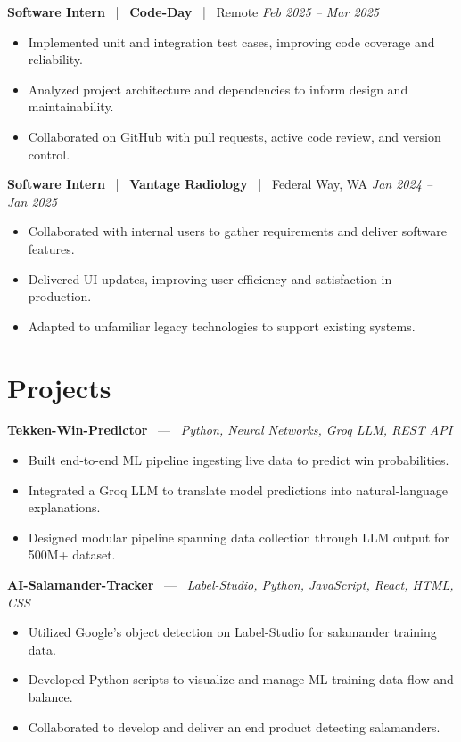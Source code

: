 \documentclass[10pt, letterpaper]{article}
\newcommand{\jobhead}[4]{%
  \vspace{5pt}%
  {\bfseries\color{dark}#1}%
  ~{\color{light}|}~%
  {\bfseries\color{navy}#2}%
  ~{\color{light}|}~%
  {\color{light}#3}%
  \hfill{\color{light}\small\textit{#4}}\\[-2pt]%
}
\newcommand{\projhead}[3]{%
  \vspace{5pt}%
  {\bfseries\color{dark}\href{#2}{#1}}%
  ~{\color{light}---}~%
  {\color{light}\small\textit{#3}}\\[-2pt]%
}
\begin{document}
\jobhead{Software Intern}{Code-Day}{Remote}{Feb 2025 – Mar 2025}
\begin{itemize}
  \item Implemented unit and integration test cases, improving code coverage and reliability.
  \item Analyzed project architecture and dependencies to inform design and maintainability.
  \item Collaborated on GitHub with pull requests, active code review, and version control.
\end{itemize}

\jobhead{Software Intern}{Vantage Radiology}{Federal Way, WA}{Jan 2024 – Jan 2025}
\begin{itemize}
  \item Collaborated with internal users to gather requirements and deliver software features.
  \item Delivered UI updates, improving user efficiency and satisfaction in production.
  \item Adapted to unfamiliar legacy technologies to support existing systems.
\end{itemize}

\section{Projects}

\projhead{Tekken-Win-Predictor}{}{Python, Neural Networks, Groq LLM, REST API}
\begin{itemize}
  \item Built end-to-end ML pipeline ingesting live data to predict win probabilities.
  \item Integrated a Groq LLM to translate model predictions into natural-language explanations.
  \item Designed modular pipeline spanning data collection through LLM output for 500M+ dataset.
\end{itemize}

\projhead{AI-Salamander-Tracker}{https://github.com/xavierb117/Salamander-Tracker-YOLO}{Label-Studio, Python, JavaScript, React, HTML, CSS}
\begin{itemize}
  \item Utilized Google's object detection on Label-Studio for salamander training data.
  \item Developed Python scripts to visualize and manage ML training data flow and balance.
  \item Collaborated to develop and deliver an end product detecting salamanders.
\end{itemize}
\end{document}
